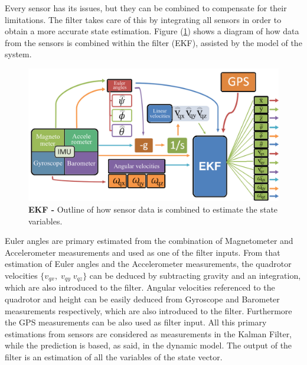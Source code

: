 \documentclass[conference]{IEEEtran}
\newcommand{\refp}[1]{(\ref{#1})}
\begin{document}
Every sensor has its issues, 
but they can be combined to compensate for their limitations. The filter takes care of this by integrating all sensors in order to obtain a more accurate state estimation. Figure \refp{fig:diagrama_kalman} shows a diagram of how data from the sensors is combined within the filter (EKF), assisted by the model of the system.
\begin{figure}[h!]
	\centering
	\includegraphics[width=1\columnwidth]{./pics_paper/diagrama_kalman_eng.png}
	\caption{\textbf{EKF - } Outline of how sensor data is combined to estimate the state variables.}
	\label{fig:diagrama_kalman}
\end{figure}
Euler angles are primary estimated from the combination of Magnetometer and Accelerometer measurements and used as one of the filter inputs. From that estimation of Euler angles and the Accelerometer measurements, the quadrotor velocities $\{v_{qx},\;v_{qy}\;v_{qz}\}$ can be deduced by subtracting gravity and an integration, which are also introduced to the filter. Angular velocities referenced to the quadrotor and height can be easily deduced from Gyroscope and Barometer measurements respectively, which are also introduced to the filter. Furthermore the GPS measurements can be also used as filter input. All this primary estimations from sensors are considered as measurements in the Kalman Filter, while the prediction is based, as said, in the dynamic model. The output of the filter is an estimation of all the variables of the state vector.\\

\end{document}
